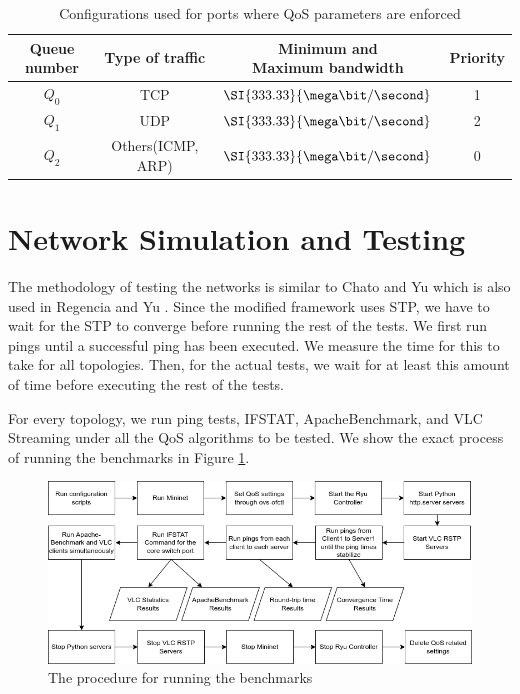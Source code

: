 \begin{table}[htbp]
    \centering
    \begin{tabular}{cccc}
    \toprule
        Queue number & Type of traffic & \thead{Minimum and \\Maximum bandwidth} & Priority\\
    \midrule
        $Q_0$ & TCP & $\SI{333.33}{\mega\bit / \second}$ & 1 \\
        $Q_1$ & UDP & $\SI{333.33}{\mega\bit / \second}$ & 2 \\
        $Q_2$ & Others(ICMP, ARP) & $\SI{333.33}{\mega\bit / \second}$ & 0 \\
    \bottomrule
    \end{tabular}
    \caption{Configurations used for ports where QoS parameters are enforced}
    \label{tab:qosconfig}
\end{table}


\section{Network Simulation and Testing}
The methodology of testing the networks is similar to Chato and Yu \cite{chato_exploration_2016} which is also used in Regencia and Yu \cite{yang_introducing_2022}. Since the modified framework uses STP, we have to wait for the STP to converge before running the rest of the tests. We first run pings until a successful ping has been executed. We measure the time for this to take for all topologies. Then, for the actual tests, we wait for at least this amount of time before executing the rest of the tests.

For every topology, we run ping tests, IFSTAT, ApacheBenchmark, and VLC Streaming under all the QoS algorithms to be tested. We show the exact process of running the benchmarks in Figure \ref{fig:benchmark}.

\begin{figure}
    \centering
    \includegraphics[width=\textwidth]{Figures/Test Procedure.drawio.png}
    \caption{The procedure for running the benchmarks}
    \label{fig:benchmark}
\end{figure}

